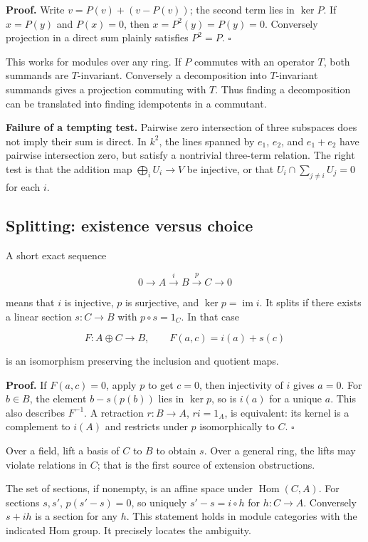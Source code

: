 \documentclass[
  11pt,
]{article}
\begin{document}
\textbf{Proof.} Write \(v=P(v)+(v-P(v))\); the second term lies in
\(\ker P\). If \(x=P(y)\) and \(P(x)=0\), then \(x=P^2(y)=P(y)=0\).
Conversely projection in a direct sum plainly satisfies \(P^2=P\).
\(\square\)

This works for modules over any ring. If \(P\) commutes with an operator
\(T\), both summands are \(T\)-invariant. Conversely a decomposition
into \(T\)-invariant summands gives a projection commuting with \(T\).
Thus finding a decomposition can be translated into finding idempotents
in a commutant.

\textbf{Failure of a tempting test.} Pairwise zero intersection of three
subspaces does not imply their sum is direct. In \(k^2\), the lines
spanned by \(e_1\), \(e_2\), and \(e_1+e_2\) have pairwise intersection
zero, but satisfy a nontrivial three-term relation. The right test is
that the addition map \(\bigoplus_i U_i\to V\) be injective, or that
\(U_i\cap\sum_{j\ne i}U_j=0\) for each \(i\).

\subsection{Splitting: existence versus
choice}\label{splitting-existence-versus-choice}

A short exact sequence

\[0\longrightarrow A\xrightarrow{i}B\xrightarrow{p}C\longrightarrow0\]

means that \(i\) is injective, \(p\) is surjective, and
\(\ker p=\operatorname{im}i\). It splits if there exists a linear
section \(s:C\to B\) with \(p\circ s=1_C\). In that case

\[F:A\oplus C\to B,\qquad F(a,c)=i(a)+s(c)\]

is an isomorphism preserving the inclusion and quotient maps.

\textbf{Proof.} If \(F(a,c)=0\), apply \(p\) to get \(c=0\), then
injectivity of \(i\) gives \(a=0\). For \(b\in B\), the element
\(b-s(p(b))\) lies in \(\ker p\), so is \(i(a)\) for a unique \(a\).
This also describes \(F^{-1}\). A retraction \(r:B\to A\), \(r i=1_A\),
is equivalent: its kernel is a complement to \(i(A)\) and restricts
under \(p\) isomorphically to \(C\). \(\square\)

Over a field, lift a basis of \(C\) to \(B\) to obtain \(s\). Over a
general ring, the lifts may violate relations in \(C\); that is the
first source of extension obstructions.

The set of sections, if nonempty, is an affine space under
\(\operatorname{Hom}(C,A)\). For sections \(s,s'\), \(p(s'-s)=0\), so
uniquely \(s'-s=i\circ h\) for \(h:C\to A\). Conversely \(s+i h\) is a
section for any \(h\). This statement holds in module categories with
the indicated Hom group. It precisely locates the ambiguity.
\end{document}
